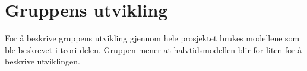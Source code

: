 \chapter{Gruppens utvikling}

For å beskrive gruppens utvikling gjennom hele prosjektet brukes modellene som ble beskrevet i teori-delen. 
Gruppen mener at halvtidsmodellen blir for liten for å beskrive utviklingen. 



